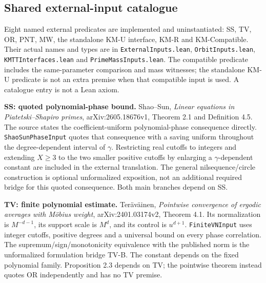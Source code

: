 \subsection*{Shared external-input catalogue}
Eight named external predicates are implemented and uninstantiated: SS, TV, OR, PNT, MW, the standalone KM-U interface, KM-R and KM-Compatible. Their actual names and types are in \texttt{ExternalInputs.lean}, \texttt{OrbitInputs.lean}, \texttt{KMTTInterfaces.lean} and \texttt{PrimeMassInputs.lean}. The compatible predicate includes the same-parameter comparison and mass witnesses; the standalone KM-U predicate is not an extra premise when that compatible input is used. A catalogue entry is not a Lean axiom.

\ifDetailed
\textbf{SS: quoted polynomial-phase bound.} Shao--Sun, \emph{Linear equations in Piatetski--Shapiro primes}, arXiv:2605.18676v1, Theorem 2.1 and Definition 4.5. The source states the coefficient-uniform polynomial-phase consequence directly. \texttt{ShaoSunPhaseInput} quotes that consequence with a saving uniform throughout the degree-dependent interval of $\gamma$. Restricting real cutoffs to integers and extending $X\geq3$ to the two smaller positive cutoffs by enlarging a $\gamma$-dependent constant are included in the external translation. The general nilsequence/circle construction is optional unformalized exposition, not an additional required bridge for this quoted consequence. Both main branches depend on SS.

\textbf{TV: finite polynomial estimate.} Ter\"av\"ainen, \emph{Pointwise convergence of ergodic averages with M\"obius weight}, arXiv:2401.03174v2, Theorem 4.1. Its normalization is $M^{-d-1}$, its support scale is $M^d$, and its control is $u^{d+1}$. \texttt{FiniteVNInput} uses integer cutoffs, positive degrees and a universal bound on every phase correlation. The supremum/sign/monotonicity equivalence with the published norm is the unformalized formulation bridge TV-B. The constant depends on the fixed polynomial family. Proposition 2.3 depends on TV; the pointwise theorem instead quotes OR independently and has no TV premise.

